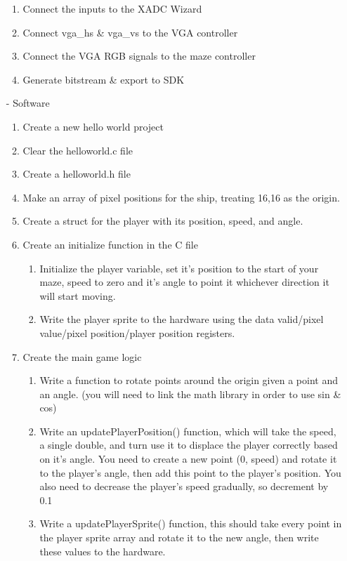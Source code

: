 \documentclass[12pt]{article}
\begin{document}
\begin{itemize}[noitemsep, nolistsep]
\begin{enumerate}
			\item Connect the inputs to the XADC Wizard
			\item Connect vga\_hs \& vga\_vs to the VGA controller
			\item Connect the VGA RGB signals to the maze controller
			\item Generate bitstream \& export to SDK
		\end{enumerate}
	\item[-] Software
		\begin{enumerate}
			\item Create a new hello world project
			\item Clear the helloworld.c file
			\item Create a helloworld.h file
			\item Make an array of pixel positions for the ship, treating 16,16 as the origin.
			\item Create a struct for the player with its position, speed, and angle.
			\item Create an initialize function in the C file
				\begin{enumerate}
					\item Initialize the player variable, set it's position to the start of your maze, speed to zero and it's angle to point it whichever direction it will start moving.
					\item Write the player sprite to the hardware using the data valid/pixel value/pixel position/player position registers.
				\end{enumerate}
			\item Create the main game logic
				\begin{enumerate}
					\item Write a function to rotate points around the origin given a point and an angle. (you will need to link the math library in order to use sin \& cos)
					\item Write an updatePlayerPosition() function, which will take the speed, a single double, and turn use it to displace the player correctly based on it's angle. You need to create a new point (0, speed) and rotate it to the player's angle, then add this point to the player's position. You also need to decrease the player's speed gradually, so decrement by 0.1
					\item Write a updatePlayerSprite() function, this should take every point in the player sprite array and rotate it to the new angle, then write these values to the hardware.

\end{enumerate}
\end{enumerate}
\end{itemize}
\end{document}
